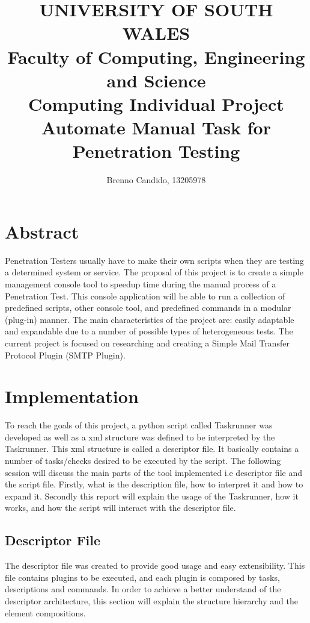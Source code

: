 \documentclass[a4paper, 12pt]{article}
\title {
			{\LARGE{\textbf{UNIVERSITY OF SOUTH WALES}}}\\
			{\large{\textsf{Faculty of Computing, Engineering and Science}}}\\
			{\large{\textsf{Computing Individual Project}}}\\
			\vspace{2.0cm}
			{\LARGE{\textbf{Automate Manual Task for Penetration Testing}}}
			\vspace{2.0cm}
}
\author { Brenno Candido, 13205978 } %
\begin{document}
\maketitle \clearpage

\tableofcontents \clearpage

\section{Abstract}

	Penetration Testers usually have to make their own scripts when they are testing a determined system or service. The proposal of this project is to
create a simple management console tool to speedup time during the manual process of a Penetration Test. This console application will be able to run a
collection of predefined scripts, other console tool, and predefined commands in a modular (plug-in) manner. The main characteristics of the project
are: easily adaptable and expandable due to a number of possible types of heterogeneous tests. The current project is focused on researching and
creating a Simple Mail Transfer Protocol Plugin (SMTP Plugin).\\

\clearpage

\section{Implementation}

	To reach the goals of this project, a python script called Taskrunner was developed as well as a xml structure was defined to be interpreted by the
Taskrunner. This xml structure is called a descriptor file. It basically contains a number of tasks/checks desired to be executed by the script. The
following session will discuss the main parts of the tool implemented i.e descriptor file and the script file. Firstly, what is the description file,
how to interpret it and how to expand it. Secondly this report will explain the usage of the Taskrunner, how it works, and how the script will interact
with the descriptor file.\\

\subsection{Descriptor File}

	The descriptor file was created to provide good usage and easy extensibility. This file contains plugins to be executed, and each plugin is composed by
tasks, descriptions and commands. In order to achieve a better understand of the descriptor architecture, this section will explain the structure
hierarchy and the element compositions.\\
\end{document}
